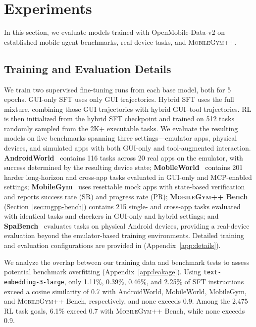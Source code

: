 
\section{Experiments}
\label{sec:exp}

In this section, we evaluate models trained with OpenMobile-Data-v2 on established mobile-agent benchmarks, real-device tasks, and \textsc{MobileGym++}. 

\subsection{Training and Evaluation Details}
\label{sec:exp-details}

We train two supervised fine-tuning runs from each base model, both for 5 epochs. GUI-only SFT uses only GUI trajectories. Hybrid SFT uses the full mixture, combining those GUI trajectories with hybrid GUI--tool trajectories. RL is then initialized from the hybrid SFT checkpoint and trained on 512 tasks randomly sampled from the 2K+ executable tasks. We evaluate the resulting models on five benchmarks spanning three settings---emulator apps, physical devices, and simulated apps with both GUI-only and tool-augmented interaction. \textbf{AndroidWorld}~\citep{rawles2025androidworld} contains 116 tasks across 20 real apps on the emulator, with success determined by the resulting device state; \textbf{MobileWorld}~\citep{kong2026mobileworld} contains 201 harder long-horizon and cross-app tasks evaluated in GUI-only and MCP-enabled settings; \textbf{MobileGym}~\citep{wu2026mobilegym} uses resettable mock apps with state-based verification and reports success rate (SR) and progress rate (PR); \textbf{\textsc{MobileGym++} Bench} (Section~\ref{sec:mgpp-bench}) contains 215 single- and cross-app tasks evaluated with identical tasks and checkers in GUI-only and hybrid settings; and \textbf{SpaBench}~\citep{chen2024spa} evaluates tasks on physical Android devices, providing a real-device evaluation beyond the emulator-based training environments. Detailed training and evaluation configurations are provided in (Appendix~\ref{app:details}).

We analyze the overlap between our training data and benchmark tests to
assess potential benchmark overfitting (Appendix~\ref{app:leakage}).
Using \texttt{text-embedding-3-large}, only 1.11\%, 0.39\%, 0.46\%, and
2.25\% of SFT instructions exceed a cosine similarity of 0.7 with
AndroidWorld, MobileWorld, MobileGym, and \textsc{MobileGym++} Bench,
respectively, and none exceeds 0.9. Among the 2,475 RL task goals, 6.1\%
exceed 0.7 with \textsc{MobileGym++} Bench, while none exceeds 0.9.


